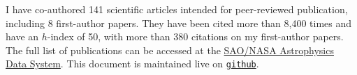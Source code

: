 I have co-authored 141 scientific articles intended for peer-reviewed 
publication, including 8 first-author papers. They have been cited more than 
8,400 times and have an $h$-index of 50, with more than 380 citations on my 
first-author papers. The full list of publications can be accessed at the 
\href{https://goo.gl/LAu9G4}{SAO/NASA Astrophysics Data System}.
%
This document is maintained live on
\href{https://github.com/cristobal-sifon/cv/blob/master/Sifon_publications.pdf}{\texttt{github}}.

